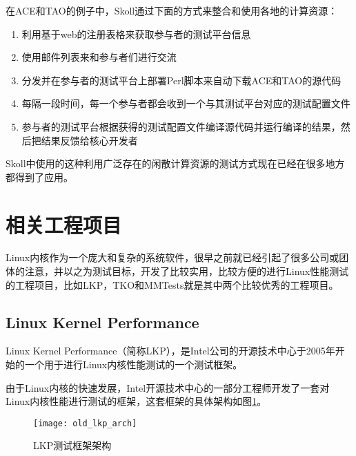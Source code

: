 在ACE和TAO的例子中，Skoll通过下面的方式来整合和使用各地的计算资源：
\begin{enumerate}
\item 利用基于web的注册表格来获取参与者的测试平台信息
\item 使用邮件列表来和参与者们进行交流
\item 分发并在参与者的测试平台上部署Perl脚本来自动下载ACE和TAO的源代码
\item 每隔一段时间，每一个参与者都会收到一个与其测试平台对应的测试配置文件
\item 参与者的测试平台根据获得的测试配置文件编译源代码并运行编译的结果，然后把结果反馈给核心开发者
\end{enumerate}

Skoll中使用的这种利用广泛存在的闲散计算资源的测试方式现在已经在很多地方都得到了应用。



\section{相关工程项目}

Linux内核作为一个庞大和复杂的系统软件，很早之前就已经引起了很多公司或团体的注意，并以之为测试目标，开发了比较实用，比较方便的进行Linux性能测试的工程项目，比如LKP\cite{chen2007keeping}，TKO\cite{bligh2006fully}和MMTests就是其中两个比较优秀的工程项目。

\subsection{Linux Kernel Performance}

Linux Kernel Performance（简称LKP），是Intel公司的开源技术中心于2005年开始的一个用于进行Linux内核性能测试的一个测试框架。

由于Linux内核的快速发展，Intel开源技术中心的一部分工程师开发了一套对Linux内核性能进行测试的框架，这套框架的具体架构如图\ref{fig:old_lkp_arch}。

\begin{figure}[H]
\centering
\texttt{[image: old\_lkp\_arch]}
\caption{LKP测试框架架构\cite{chen2007keeping}}
\label{fig:old_lkp_arch}
\end{figure}

